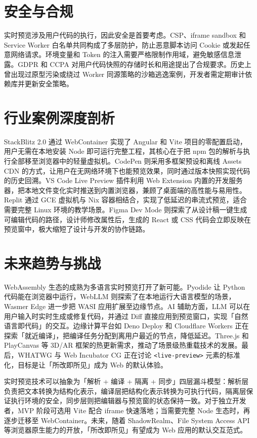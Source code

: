 \chapter{安全与合规}
实时预览涉及用户代码的执行，因此安全是首要考虑。CSP、iframe sandbox 和 Service Worker 白名单共同构成了多层防护，防止恶意脚本访问 Cookie 或发起任意网络请求。环境变量和 Token 的注入需要严格限制作用域，避免敏感信息泄露。GDPR 和 CCPA 对用户代码快照的存储时长和用途提出了合规要求。历史上曾出现过原型污染或绕过 Worker 同源策略的沙箱逃逸案例，开发者需定期审计依赖库并更新安全策略。\par
\chapter{行业案例深度剖析}
StackBlitz 2.0 通过 WebContainer 实现了 Angular 和 Vite 项目的零配置启动，用户无需在本地安装 Node 即可运行完整工程，其核心在于把 npm 包的解析与执行全部移至浏览器中的轻量虚拟机。CodePen 则采用多框架预设和离线 Assets CDN 的方式，让用户在无网络环境下也能预览效果，同时通过版本快照实现代码的历史回溯。VS Code Live Preview 插件利用 Web Extension 内置的开发服务器，把本地文件变化实时推送到内置浏览器，兼顾了桌面端的高性能与易用性。Replit 通过 GCE 虚拟机与 Nix 容器相结合，实现了低延迟的串流式预览，适合需要完整 Linux 环境的教学场景。Figma Dev Mode 则探索了从设计稿一键生成可编辑代码的路径，设计师修改属性后，生成的 React 或 CSS 代码会立即反映在预览窗中，极大缩短了设计与开发的协作链路。\par
\chapter{未来趋势与挑战}
WebAssembly 生态的成熟为多语言实时预览打开了新可能。Pyodide 让 Python 代码能在浏览器中运行，WebLLM 则探索了在本地运行大语言模型的场景，Wasmer Edge 进一步把 WASI 应用扩展至边缘节点。AI 辅助方面，LLM 可以在用户输入时实时生成或修复代码，并通过 Diff 直接应用到预览窗口，实现「自然语言即代码」的交互。边缘计算平台如 Deno Deploy 和 Cloudflare Workers 正在探索「就近编译」，把编译任务分配到离用户最近的节点，降低延迟。Three.js 和 PlayCanvas 等 3D/AR 框架的热更新需求，推动了场景级热重载技术的发展。最后，WHATWG 与 Web Incubator CG 正在讨论 \texttt{<live-preview>} 元素的标准化，目标是让「所改即所见」成为 Web 的默认体验。\par
实时预览技术可以抽象为「解析 + 编译 + 隔离 + 同步」四层漏斗模型：解析层负责把文本转换为结构化表示，编译层把结构化表示转换为可执行代码，隔离层保证执行环境的安全，同步层则把编辑器与预览窗的状态保持一致。对于独立开发者，MVP 阶段可选用 Vite 配合 iframe 快速落地；当需要完整 Node 生态时，再逐步迁移至 WebContainer。未来，随着 ShadowRealm、File System Access API 等浏览器原生能力的开放，「所改即所见」有望成为 Web 应用的默认交互范式。\par
